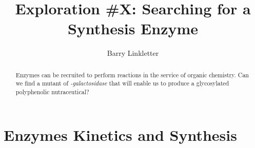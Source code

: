 \documentclass[]{tufte-handout}
\title{Exploration \#X: Searching for a Synthesis Enzyme}
\author[Barry Linkletter]{Barry Linkletter}
\date{} %
\begin{document}
\justifying


\maketitle%

\begin{abstract}
\noindent Enzymes can be recruited to perform reactions in the service of organic chem\-istry. Can we find a mutant of  \emph{\textbeta -galactosidase} that will enable us to produce a gly\-cos\-yl\-at\-ed polyphenolic nutraceutical?

\end{abstract}





\section{Enzymes Kinetics and Synthesis}
\end{document}
